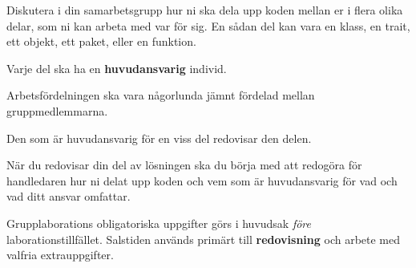 \item
Diskutera i din samarbetsgrupp hur ni ska dela upp koden mellan er i flera olika delar, som ni kan arbeta med var för sig. En sådan del kan vara en klass, en trait, ett objekt, ett paket, eller en funktion.
\item
Varje del ska ha en \textbf{huvudansvarig} individ.
\item
Arbetsfördelningen ska vara någorlunda jämnt fördelad mellan gruppmedlemmarna.
\item
Den som är huvudansvarig för en viss del redovisar den delen.
\item
När du redovisar din del av lösningen ska du börja med att redogöra för handledaren hur ni delat upp koden och vem som är huvudansvarig för vad och vad ditt ansvar omfattar.
\item
Grupplaborations obligatoriska uppgifter görs i huvudsak \emph{före} laborationstillfället. Salstiden används primärt till \textbf{redovisning} och arbete med valfria extrauppgifter.
